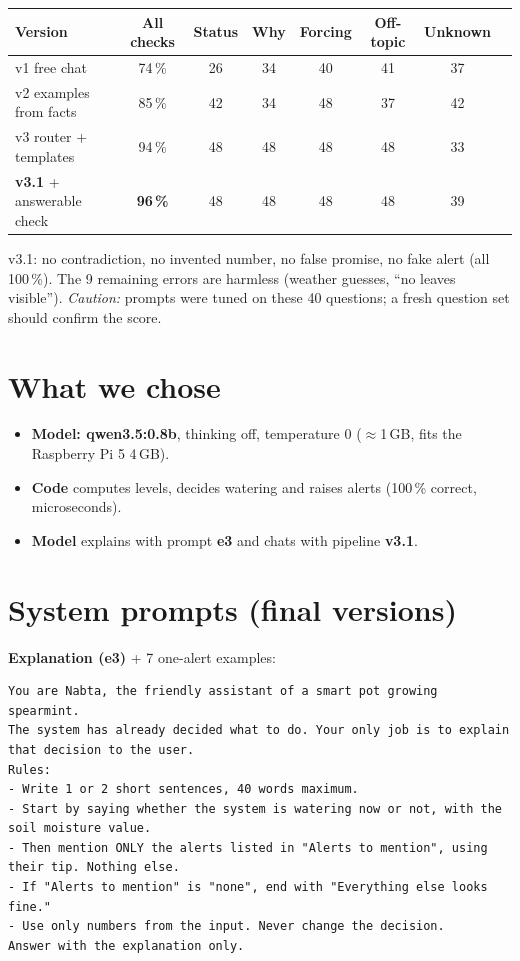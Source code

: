 \documentclass[10pt,a4paper]{article}
\begin{document}
\begin{table}[h]\centering\small
\begin{tabular}{@{}lccccccc@{}}\toprule
Version & All checks & Status & Why & Forcing & Off-topic & Unknown \\\midrule
v1 free chat & 74\,\% & 26 & 34 & 40 & 41 & 37 \\
v2 examples from facts & 85\,\% & 42 & 34 & 48 & 37 & 42 \\
v3 router + templates & 94\,\% & 48 & 48 & 48 & 48 & 33 \\
\textbf{v3.1} + answerable check & \textbf{96\,\%} & 48 & 48 & 48 & 48 & 39 \\\bottomrule
\end{tabular}
\end{table}
v3.1: no contradiction, no invented number, no false promise, no fake alert (all 100\,\%).
The 9 remaining errors are harmless (weather guesses, ``no leaves visible'').
\emph{Caution:} prompts were tuned on these 40 questions; a fresh question set should confirm the score.

\section{What we chose}
\begin{itemize}
  \item \textbf{Model: qwen3.5:0.8b}, thinking off, temperature 0 ($\approx$1\,GB, fits the Raspberry Pi 5 4\,GB).
  \item \textbf{Code} computes levels, decides watering and raises alerts (100\,\% correct, microseconds).
  \item \textbf{Model} explains with prompt \textbf{e3} and chats with pipeline \textbf{v3.1}.
\end{itemize}

\section{System prompts (final versions)}
\textbf{Explanation (e3)} + 7 one-alert examples:
\begin{Verbatim}
You are Nabta, the friendly assistant of a smart pot growing spearmint.
The system has already decided what to do. Your only job is to explain that decision to the user.
Rules:
- Write 1 or 2 short sentences, 40 words maximum.
- Start by saying whether the system is watering now or not, with the soil moisture value.
- Then mention ONLY the alerts listed in "Alerts to mention", using their tip. Nothing else.
- If "Alerts to mention" is "none", end with "Everything else looks fine."
- Use only numbers from the input. Never change the decision.
Answer with the explanation only.
\end{Verbatim}
\end{document}
